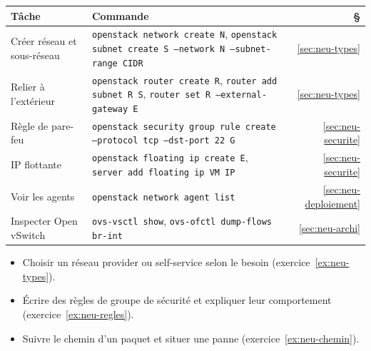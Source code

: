 \begin{center}
\renewcommand{\arraystretch}{1.35}
\begin{tabular}{@{}>{\raggedright\arraybackslash}p{4.0cm}>{\raggedright\arraybackslash}p{10.1cm}r@{}}
\toprule
\textbf{Tâche} & \textbf{Commande} & \textbf{§} \\
\midrule
Créer réseau et sous-réseau & \texttt{openstack network create N}, \texttt{openstack subnet create S --network N --subnet-range CIDR} & \ref{sec:neu-types} \\
Relier à l'extérieur & \texttt{openstack router create R}, \texttt{router add subnet R S}, \texttt{router set R --external-gateway E} & \ref{sec:neu-types} \\
Règle de pare-feu & \texttt{openstack security group rule create --protocol tcp --dst-port 22 G} & \ref{sec:neu-securite} \\
IP flottante & \texttt{openstack floating ip create E}, \texttt{server add floating ip VM IP} & \ref{sec:neu-securite} \\
Voir les agents & \texttt{openstack network agent list} & \ref{sec:neu-deploiement} \\
Inspecter Open vSwitch & \texttt{ovs-vsctl show}, \texttt{ovs-ofctl dump-flows br-int} & \ref{sec:neu-archi} \\
\bottomrule
\end{tabular}
\end{center}

\begin{savoirfaire}
\begin{itemize}
  \item Choisir un réseau provider ou self-service selon le besoin (exercice~\ref{ex:neu-types}).
  \item Écrire des règles de groupe de sécurité et expliquer leur comportement (exercice~\ref{ex:neu-regles}).
  \item Suivre le chemin d'un paquet et situer une panne (exercice~\ref{ex:neu-chemin}).
\end{itemize}
\end{savoirfaire}

